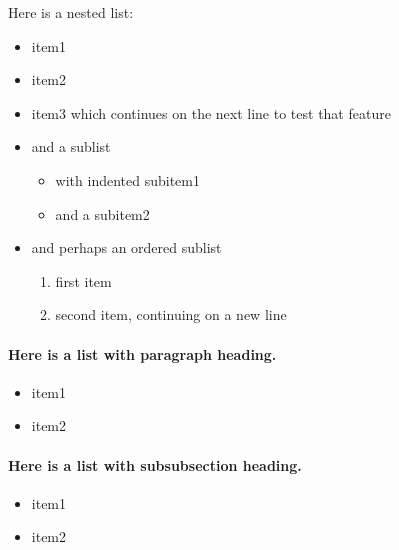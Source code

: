 \documentclass[%
oneside,                 %
final,                   %
10pt]{article}
\theoremstyle{definition}
\begin{document}
Here is a nested list:

\begin{itemize}
  \item item1

  \item item2

  \item item3 which continues on the next line to test that feature

  \item and a sublist
\begin{itemize}

    \item with indented subitem1

    \item and a subitem2

\end{itemize}

\noindent
  \item and perhaps an ordered sublist
\begin{enumerate}

   \item first item

   \item second item, continuing on a new line
\end{enumerate}

\noindent
\end{itemize}

\noindent
\paragraph{Here is a list with paragraph heading.}

\begin{itemize}
  \item item1

  \item item2
\end{itemize}

\noindent
\paragraph{Here is a list with subsubsection heading.}
\begin{itemize}
  \item item1

  \item item2
\end{itemize}

\noindent
\end{document}
